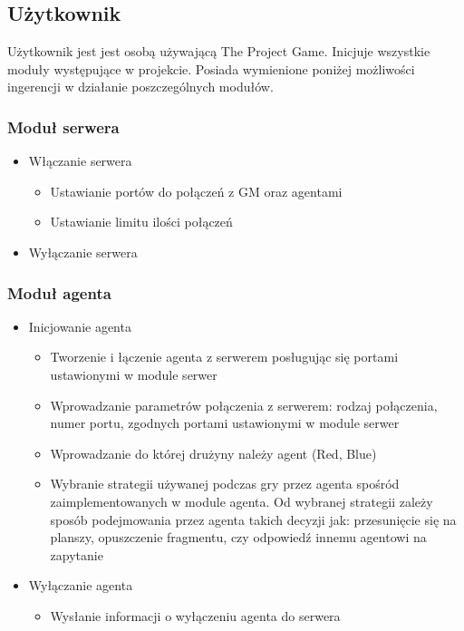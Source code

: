 \documentclass[../Dokumentacja.tex]{subfiles}
\begin{document}
\subsection{Użytkownik}
Użytkownik jest jest osobą używającą The Project Game.  Inicjuje wszystkie moduły występujące w projekcie. Posiada wymienione poniżej możliwości ingerencji w działanie poszczególnych modułów.
\subsubsection{Moduł serwera}
\begin{itemize}
    \item Włączanie serwera
    \begin{itemize}
    	\item Ustawianie portów do połączeń z GM oraz agentami
    	\item Ustawianie limitu ilości połączeń
    \end{itemize}
    \item Wyłączanie serwera
\end{itemize}

\subsubsection{Moduł agenta}
\begin{itemize}
	\item Inicjowanie agenta
	\begin{itemize}
		\item Tworzenie i łączenie agenta z serwerem posługując się portami ustawionymi w module serwer
		\item Wprowadzanie parametrów połączenia z serwerem: rodzaj połączenia, numer portu, zgodnych portami ustawionymi w module serwer
		\item Wprowadzanie do której drużyny należy agent (Red, Blue)
		\item Wybranie strategii używanej podczas gry przez agenta spośród zaimplementowanych w module agenta. Od wybranej strategii zależy sposób podejmowania przez agenta takich decyzji jak: przesunięcie się na planszy, opuszczenie fragmentu, czy odpowiedź innemu agentowi na zapytanie
	\end{itemize}
	\item Wyłączanie agenta
	\begin{itemize}
		\item Wysłanie informacji o wyłączeniu agenta do serwera
	\end{itemize}
\end{itemize}
\end{document}
